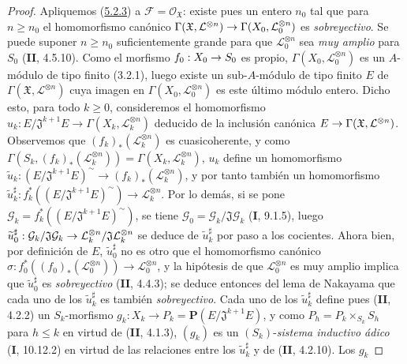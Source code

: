 \documentclass[10pt,oneside,openany]{book}
\theoremstyle{egaenv}\newtheorem*{env}{---}
\theoremstyle{egastatement}
\theoremstyle{egadescription}
\renewcommand{\leq}{\leqslant}
\renewcommand{\geq}{\geqslant}
\renewcommand{\to}{\mathchoice{\longrightarrow}{\rightarrow}{\rightarrow}{\rightarrow}}
\begin{document}
\begin{proof}
Apliquemos (\hyperref[III.5.2.3-fr]{5.2.3}) a
$\mathcal F=\mathcal O_{\mathfrak X}$: existe pues un entero $n_0$ tal que
para $n\geq n_0$ el homomorfismo canónico
$\Gamma(\mathfrak X,\mathcal L^{\otimes n})\to
\Gamma(X_0,\mathcal L_0^{\otimes n})$ es \emph{sobreyectivo}. Se puede suponer
$n\geq n_0$ suficientemente grande para que $\mathcal L_0^{\otimes n}$ sea \emph{muy
amplio} para $S_0$ (\textbf{II}, 4.5.10). Como el morfismo $f_0:X_0\to S_0$ es propio,
$\Gamma(X_0,\mathcal L_0^{\otimes n})$ es un $A$-módulo de tipo finito (3.2.1),
luego existe un sub-$A$-módulo de tipo finito $E$ de
$\Gamma(\mathfrak X,\mathcal L^{\otimes n})$ cuya imagen en
$\Gamma(X_0,\mathcal L_0^{\otimes n})$ es este último módulo entero.
Dicho esto, para todo $k\geq0$, consideremos el homomorfismo
$u_k:E/\mathfrak J^{k+1}E\longrightarrow
\Gamma(X_k,\mathcal L_k^{\otimes n})$
deducido de la inclusión canónica
$E\to\Gamma(\mathfrak X,\mathcal L^{\otimes n})$. Observemos que
$(f_k)_*(\mathcal L_k^{\otimes n})$ es cuasicoherente, y como
$\Gamma(S_k,(f_k)_*(\mathcal L_k^{\otimes n}))
=\Gamma(X_k,\mathcal L_k^{\otimes n})$, $u_k$ define un homomorfismo
$\widetilde u_k:(E/\mathfrak J^{k+1}E)^\sim
\longrightarrow(f_k)_*(\mathcal L_k^{\otimes n})$,
y por tanto también un homomorfismo
$\widetilde u_k^\sharp:
f_k^*((E/\mathfrak J^{k+1}E)^\sim)\longrightarrow
\mathcal L_k^{\otimes n}$.
Por lo demás, si se pone
$\mathcal G_k=f_k^*((E/\mathfrak J^{k+1}E)^\sim)$, se tiene
$\mathcal G_0=\mathcal G_k/\mathfrak J\mathcal G_k$ (\textbf{I}, 9.1.5), luego
$\widetilde u_0^\sharp:\mathcal G_k/\mathfrak J\mathcal G_k
\to\mathcal L_k^{\otimes n}/\mathfrak J\mathcal L_k^{\otimes n}$ se deduce
de $\widetilde u_k^\sharp$ por paso a los cocientes. Ahora bien, por definición de
$E$, $\widetilde u_0^\sharp$ no es otro que el homomorfismo canónico
$\sigma:f_0^*((f_0)_*(\mathcal L_0^{\otimes n}))\longrightarrow
\mathcal L_0^{\otimes n}$,
y la hipótesis de que $\mathcal L_0^{\otimes n}$ es muy amplio implica que
$\widetilde u_0^\sharp$ es \emph{sobreyectivo} (\textbf{II}, 4.4.3); se deduce entonces del lema
de Nakayama que cada uno de los $\widetilde u_k^\sharp$ es también \emph{sobreyectivo}.
Cada uno de los $\widetilde u_k^\sharp$ define pues (\textbf{II}, 4.2.2) un
$S_k$-morfismo
$g_k:X_k\longrightarrow P_k=\mathbf P(E/\mathfrak J^{k+1}E)$,
y como $P_h=P_k\times_{S_k}S_h$ para $h\leq k$ en virtud de (\textbf{II}, 4.1.3),
$(g_k)$ es un $(S_k)$-\emph{sistema inductivo ádico} (\textbf{I}, 10.12.2) en virtud de las
relaciones entre los $\widetilde u_k^\sharp$ y de (\textbf{II}, 4.2.10). Los $g_k$

\end{proof}
\end{document}
